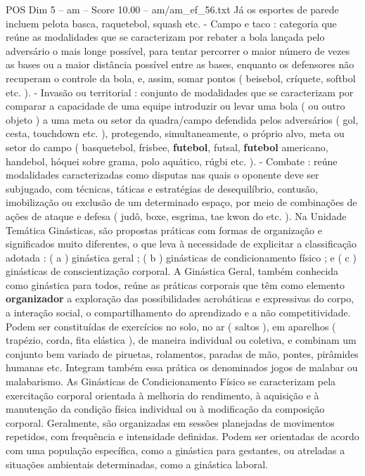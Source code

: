 \begin{textsample}{POS Dim 5 – am – Score 10.00 – am/am\_ef\_56.txt}
Já os esportes de parede incluem pelota basca, raquetebol, squash etc. - Campo e taco : categoria que reúne as modalidades que se caracterizam por rebater a bola lançada pelo adversário o mais longe possível, para tentar percorrer o maior número de vezes as bases ou a maior distância possível entre as bases, enquanto os defensores não recuperam o controle da bola, e, assim, somar pontos ( beisebol, críquete, softbol etc. ). - Invasão ou territorial : conjunto de modalidades que se caracterizam por comparar a capacidade de uma equipe introduzir ou levar uma bola ( ou outro objeto ) a uma meta ou setor da quadra/campo defendida pelos adversários ( gol, cesta, touchdown etc. ), protegendo, simultaneamente, o próprio alvo, meta ou setor do campo ( basquetebol, frisbee, \textbf{futebol}, futsal, \textbf{futebol} americano, handebol, hóquei sobre grama, polo aquático, rúgbi etc. ). - Combate : reúne modalidades caracterizadas como disputas nas quais o oponente deve ser subjugado, com técnicas, táticas e estratégias de desequilíbrio, contusão, imobilização ou exclusão de um determinado espaço, por meio de combinações de ações de ataque e defesa ( judô, boxe, esgrima, tae kwon do etc. ).
Na Unidade Temática Ginásticas, são propostas práticas com formas de organização e significados muito diferentes, o que leva à necessidade de explicitar a classificação adotada : ( a ) ginástica geral ; ( b ) ginásticas de condicionamento físico ; e ( c ) ginásticas de conscientização corporal.
A Ginástica Geral, também conhecida como ginástica para todos, reúne as práticas corporais que têm como elemento \textbf{organizador} a exploração das possibilidades acrobáticas e expressivas do corpo, a interação social, o compartilhamento do aprendizado e a não competitividade.
Podem ser constituídas de exercícios no solo, no ar ( saltos ), em aparelhos ( trapézio, corda, fita elástica ), de maneira individual ou coletiva, e combinam um conjunto bem variado de piruetas, rolamentos, paradas de mão, pontes, pirâmides humanas etc.
Integram também essa prática os denominados jogos de malabar ou malabarismo.
As Ginásticas de Condicionamento Físico se caracterizam pela exercitação corporal orientada à melhoria do rendimento, à aquisição e à manutenção da condição física individual ou à modificação da composição corporal.
Geralmente, são organizadas em sessões planejadas de movimentos repetidos, com frequência e intensidade definidas.
Podem ser orientadas de acordo com uma população específica, como a ginástica para gestantes, ou atreladas a situações ambientais determinadas, como a ginástica laboral.

\end{textsample}
